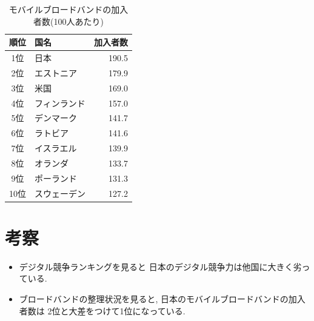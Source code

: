 \documentclass[a4paper,11pt,dvipdfmx]{ujarticle}
\begin{document}
\begin{table}[htbp]
    \centering
    \caption{モバイルブロードバンドの加入者数(100人あたり)}
    \label{tbl:加入者数}

    \begin{tabular}{|c|l|r|}
        \hline
        順位 & 国名 & 加入者数 \\
        \hline
        1位 & 日本 & 190.5 \\
        \hline
        2位 & エストニア & 179.9 \\
        \hline
        3位 & 米国 & 169.0 \\
        \hline
        4位 & フィンランド & 157.0 \\
        \hline
        5位 & デンマーク & 141.7 \\
        \hline
        6位 & ラトビア & 141.6 \\
        \hline 
        7位 & イスラエル & 139.9 \\
        \hline
        8位 & オランダ & 133.7 \\
        \hline
        9位 & ポーランド & 131.3 \\
        \hline
        10位 & スウェーデン & 127.2 \\
        \hline
    \end{tabular}
\end{table}

\section{考察}

\begin{itemize}
    \item デジタル競争ランキングを見ると
    日本のデジタル競争力は他国に大きく劣っている.
    \item ブロードバンドの整理状況を見ると,
    日本のモバイルブロードバンドの加入者数は
    2位と大差をつけて1位になっている.
\end{itemize}



\end{document}
